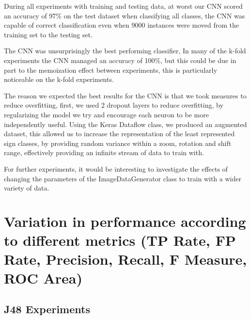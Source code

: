 \documentclass[11pt]{article}
\begin{document}
During all experiments with training and testing data, at worst our CNN scored an accuracy of 97\% on the test dataset when classifying all classes, the CNN was capable of correct classification even when 9000 instances were moved from the training set to the testing set.

The CNN was unsurprisingly the best performing classifier, In many of the k-fold experiments the CNN managed an accuracy of 100\%, but this could be due in part to the memoization effect between experiments, this is particularly noticeable on the k-fold experiments.

The reason we expected the best results for the CNN is that we took measures to reduce overfitting, first, we used 2 dropout layers to reduce overfitting, by regularizing the model we try and encourage each neuron to be more independently useful.
Using the Keras Dataflow class, we produced an augmented dataset, this allowed us to increase the representation of the least represented sign classes, by providing random variance within a zoom, rotation and shift range, effectively providing an infinite stream of data to train with.

For further experiments, it would be interesting to investigate the effects of changing the parameters of the ImageDataGenerator class to train with a wider variety of data.



\newpage
\section{Variation in performance according to different metrics (TP Rate, FP Rate, Precision,
Recall, F Measure, ROC Area)}
\subsection{J48 Experiments}
\end{document}
